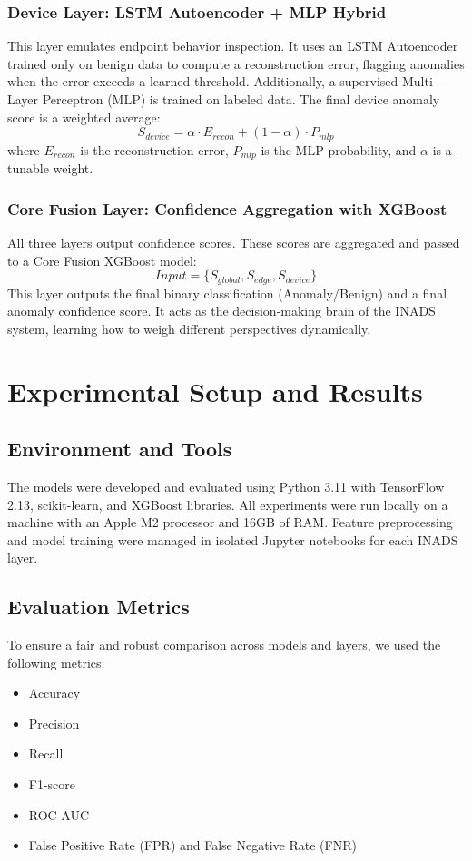\documentclass[conference]{IEEEtran}
\begin{document}
\subsubsection{Device Layer: LSTM Autoencoder + MLP Hybrid}
This layer emulates endpoint behavior inspection. It uses an LSTM Autoencoder trained only on benign data to compute a reconstruction error, flagging anomalies when the error exceeds a learned threshold. Additionally, a supervised Multi-Layer Perceptron (MLP) is trained on labeled data. The final device anomaly score is a weighted average:
\[
S_{device} = \alpha \cdot E_{recon} + (1 - \alpha) \cdot P_{mlp}
\]
where \( E_{recon} \) is the reconstruction error, \( P_{mlp} \) is the MLP probability, and \( \alpha \) is a tunable weight.

\subsubsection{Core Fusion Layer: Confidence Aggregation with XGBoost}
All three layers output confidence scores. These scores are aggregated and passed to a Core Fusion XGBoost model:
\[
Input = \{ S_{global}, S_{edge}, S_{device} \}
\]
This layer outputs the final binary classification (Anomaly/Benign) and a final anomaly confidence score. It acts as the decision-making brain of the INADS system, learning how to weigh different perspectives dynamically.

\section{Experimental Setup and Results}

\subsection{Environment and Tools}
The models were developed and evaluated using Python 3.11 with TensorFlow 2.13, scikit-learn, and XGBoost libraries. All experiments were run locally on a machine with an Apple M2 processor and 16GB of RAM. Feature preprocessing and model training were managed in isolated Jupyter notebooks for each INADS layer.

\subsection{Evaluation Metrics}
To ensure a fair and robust comparison across models and layers, we used the following metrics:
\begin{itemize}
    \item Accuracy
    \item Precision
    \item Recall
    \item F1-score
    \item ROC-AUC
    \item False Positive Rate (FPR) and False Negative Rate (FNR)
\end{itemize}
\end{document}

